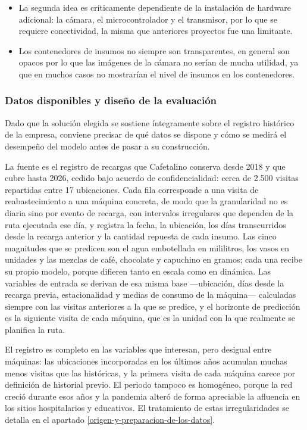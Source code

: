 \begin{itemize}
\item
  La segunda idea es críticamente dependiente de la instalación de hardware adicional: la cámara, el microcontrolador y el transmisor, por lo que se requiere conectividad, la misma que anteriores proyectos fue una limitante.
\item
  Los contenedores de insumos no siempre son transparentes, en general son opacos por lo que las imágenes de la cámara no serían de mucha utilidad, ya que en muchos casos no mostrarían el nivel de insumos en los contenedores.
\end{itemize}

\subsubsection{Datos disponibles y diseño de la evaluación}\label{datos-disponibles-y-diseno-de-la-evaluacion}

Dado que la solución elegida se sostiene íntegramente sobre el registro histórico de la empresa, conviene precisar de qué datos se dispone y cómo se medirá el desempeño del modelo antes de pasar a su construcción.

La fuente es el registro de recargas que Cafetalino conserva desde 2018 y que cubre hasta 2026, cedido bajo acuerdo de confidencialidad: cerca de 2.500 visitas repartidas entre 17 ubicaciones. Cada fila corresponde a una visita de reabastecimiento a una máquina concreta, de modo que la granularidad no es diaria sino por evento de recarga, con intervalos irregulares que dependen de la ruta ejecutada ese día, y registra la fecha, la ubicación, los días transcurridos desde la recarga anterior y la cantidad repuesta de cada insumo. Las cinco magnitudes que se predicen son el agua embotellada en mililitros, los vasos en unidades y las mezclas de café, chocolate y capuchino en gramos; cada una recibe su propio modelo, porque difieren tanto en escala como en dinámica. Las variables de entrada se derivan de esa misma base —ubicación, días desde la recarga previa, estacionalidad y medias de consumo de la máquina— calculadas siempre con las visitas anteriores a la que se predice, y el horizonte de predicción es la siguiente visita de cada máquina, que es la unidad con la que realmente se planifica la ruta.

El registro es completo en las variables que interesan, pero desigual entre máquinas: las ubicaciones incorporadas en los últimos años acumulan muchas menos visitas que las históricas, y la primera visita de cada máquina carece por definición de historial previo. El periodo tampoco es homogéneo, porque la red creció durante esos años y la pandemia alteró de forma apreciable la afluencia en los sitios hospitalarios y educativos. El tratamiento de estas irregularidades se detalla en el apartado \ref{origen-y-preparacion-de-los-datos}.

